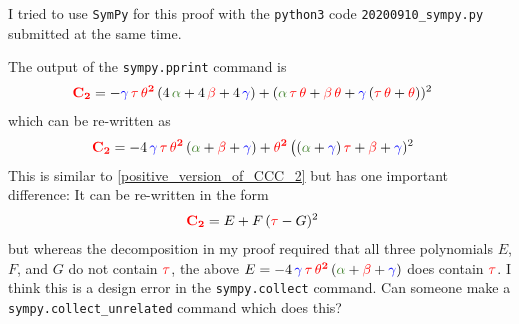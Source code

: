 \documentclass[legalpaper]{article}
\newcommand\mycdot{\,}
\newcommand\alphaC{{\color{OliveGreen}\mathbf\alpha}}
\newcommand\betaC{{\color{red}\mathbf\beta}}
\newcommand\gammaC{{\color{blue}\mathbf\gamma}}
\newcommand\thetaC{{\color{red}\mathbf\theta}}
\newcommand\CCCtwoC{{\color{red}\mathbf{C_2}}}
\newcommand\tauC{{\color{red}\mathbf\tau}}
\newcommand\thetaSquaredC{{\color{red}\mathbf{\theta^2}}}
\begin{document}
                 I tried to use \texttt{SymPy} for this proof with the \texttt{python3} code
                 \texttt{20200910\_sympy.py}
                 submitted at the same time.
 \begin{scriptsize}
    
 \end{scriptsize}
 The output of the \texttt{sympy.pprint} command is
  \begin{align}
    \CCCtwoC &=-\gammaC{\mycdot}\tauC{\mycdot}\thetaSquaredC{\mycdot}(4{\mycdot}\alphaC + 4{\mycdot}\betaC + 4{\mycdot}\gammaC)
    + (\alphaC{\mycdot}\tauC{\mycdot}\thetaC + \betaC{\mycdot}\thetaC + \gammaC{\mycdot}(\tauC{\mycdot}\thetaC + \thetaC))^2\notag
  \end{align}
 which can be re-written as
  \begin{align}
    \CCCtwoC &=-4{\mycdot}\gammaC{\mycdot}\tauC{\mycdot}\thetaSquaredC{\mycdot}(\alphaC + \betaC + \gammaC)
    + \thetaSquaredC{\mycdot}\bigl((\alphaC+\gammaC){\mycdot}\tauC + \betaC + \gammaC)^2\notag
  \end{align}
  This is similar to \eqref{positive_version_of_CCC_2} but has one important difference:
  It can be re-written in the form
      \begin{align}
      \CCCtwoC&= {E} +  {F}{\mycdot}(\tauC-{G})^2\notag
      \end{align}
      but whereas the decomposition in my proof required that all three polynomials \({E}\), \({F}\), and \({G}\)
      do not contain \(\tauC\),
      the above \({E}=-4{\mycdot}\gammaC{\mycdot}\tauC{\mycdot}\thetaSquaredC{\mycdot}(\alphaC + \betaC + \gammaC)\)
      does contain \(\tauC\).
      I think this is a design error in the \texttt{sympy.collect} command.
      Can someone make a \texttt{sympy.collect\_unrelated} command
      which does this?
\end{document}
